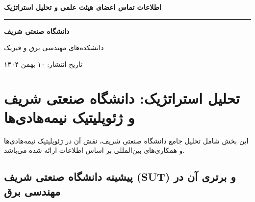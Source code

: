 \documentclass[10pt]{report}
\newcommand{\lat}[1]{\lr{#1}}
\begin{document}
\thispagestyle{empty}
\begin{center}
\vspace*{2cm}

{\Huge\bfseries\color{headerColor} اطلاعات تماس اعضای هیئت علمی و تحلیل استراتژیک}

\vspace{0.6cm}
{\color{accentColor}\rule{0.7\textwidth}{0.75pt}}
\vspace{0.6cm}

{\Large\bfseries دانشگاه صنعتی شریف}

\vspace{0.2cm}
{\large دانشکده‌های مهندسی برق و فیزیک}

\vspace{1.5cm}


\vfill
{\small\color{gray} تاریخ انتشار: ۱۰ بهمن ۱۴۰۴}
\end{center}

\clearpage
\tableofcontents

\clearpage
\chapter{تحلیل استراتژیک: دانشگاه صنعتی شریف و ژئوپلیتیک نیمه‌هادی‌ها}

\begin{keyconceptbox}
این بخش شامل تحلیل جامع دانشگاه صنعتی شریف، نقش آن در ژئوپلیتیک نیمه‌هادی‌ها و همکاری‌های بین‌المللی بر اساس اطلاعات ارائه شده می‌باشد.
\end{keyconceptbox}

\section{پیشینه دانشگاه صنعتی شریف (SUT) و برتری آن در مهندسی برق}
\end{document}
